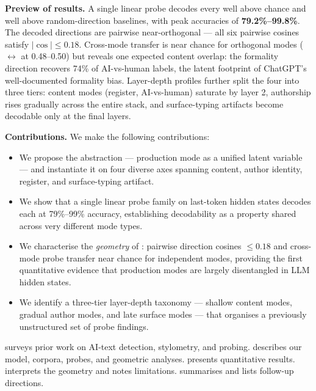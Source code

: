 {\bf Preview of results.} A single linear probe decodes every \modes well above chance and well above random-direction baselines, with peak accuracies of \textbf{79.2\%--99.8\%}. The decoded directions are pairwise near-orthogonal --- all six pairwise cosines satisfy $|\cos| \leq 0.18$. Cross-mode transfer is near chance for orthogonal modes (\typo $\leftrightarrow$ \register at 0.48--0.50) but reveals one expected content overlap: the formality direction recovers 74\% of AI-vs-human labels, the latent footprint of ChatGPT's well-documented formality bias. Layer-depth profiles further split the four \modes into three tiers: content modes (register, AI-vs-human) saturate by layer 2, authorship rises gradually across the entire stack, and surface-typing artifacts become decodable only at the final layers.

{\bf Contributions.} We make the following contributions:
\begin{itemize}[leftmargin=*,itemsep=0pt,topsep=0pt]
    \item We propose the \modes abstraction --- production mode as a unified latent variable --- and instantiate it on four diverse axes spanning content, author identity, register, and surface-typing artifact.
    \item We show that a single linear probe family on \qwen last-token hidden states decodes each \modes at 79\%--99\% accuracy, establishing decodability as a property shared across very different mode types.
    \item We characterise the \emph{geometry} of \modes: pairwise direction cosines $\leq 0.18$ and cross-mode probe transfer near chance for independent modes, providing the first quantitative evidence that production modes are largely disentangled in LLM hidden states.
    \item We identify a three-tier layer-depth taxonomy --- shallow content modes, gradual author modes, and late surface modes --- that organises a previously unstructured set of probe findings.
\end{itemize}

 surveys prior work on AI-text detection, stylometry, and probing.  describes our model, corpora, probes, and geometric analyses.  presents quantitative results.  interprets the geometry and notes limitations.  summarises and lists follow-up directions.
